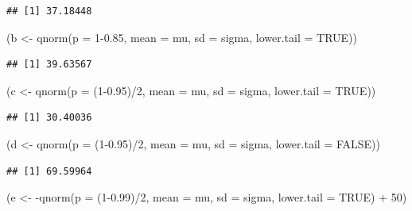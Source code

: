 \documentclass[
]{book}
\newenvironment{Shaded}{\begin{snugshade}}{\end{snugshade}}
\newcommand{\AttributeTok}[1]{\textcolor[rgb]{0.77,0.63,0.00}{#1}}
\newcommand{\ConstantTok}[1]{\textcolor[rgb]{0.00,0.00,0.00}{#1}}
\newcommand{\DecValTok}[1]{\textcolor[rgb]{0.00,0.00,0.81}{#1}}
\newcommand{\FloatTok}[1]{\textcolor[rgb]{0.00,0.00,0.81}{#1}}
\newcommand{\FunctionTok}[1]{\textcolor[rgb]{0.00,0.00,0.00}{#1}}
\newcommand{\NormalTok}[1]{#1}
\newcommand{\OtherTok}[1]{\textcolor[rgb]{0.56,0.35,0.01}{#1}}
\newcommand{\SpecialCharTok}[1]{\textcolor[rgb]{0.00,0.00,0.00}{#1}}
\begin{document}
\begin{verbatim}
## [1] 37.18448
\end{verbatim}

\begin{Shaded}
\begin{Highlighting}[]
\NormalTok{(b }\OtherTok{\textless{}{-}} \FunctionTok{qnorm}\NormalTok{(}\AttributeTok{p =} \DecValTok{1}\FloatTok{{-}0.85}\NormalTok{, }\AttributeTok{mean =}\NormalTok{ mu, }\AttributeTok{sd =}\NormalTok{ sigma, }\AttributeTok{lower.tail =} \ConstantTok{TRUE}\NormalTok{))}
\end{Highlighting}
\end{Shaded}

\begin{verbatim}
## [1] 39.63567
\end{verbatim}

\begin{Shaded}
\begin{Highlighting}[]
\NormalTok{(c }\OtherTok{\textless{}{-}} \FunctionTok{qnorm}\NormalTok{(}\AttributeTok{p =}\NormalTok{ (}\DecValTok{1}\FloatTok{{-}0.95}\NormalTok{)}\SpecialCharTok{/}\DecValTok{2}\NormalTok{, }\AttributeTok{mean =}\NormalTok{ mu, }\AttributeTok{sd =}\NormalTok{ sigma, }\AttributeTok{lower.tail =} \ConstantTok{TRUE}\NormalTok{))}
\end{Highlighting}
\end{Shaded}

\begin{verbatim}
## [1] 30.40036
\end{verbatim}

\begin{Shaded}
\begin{Highlighting}[]
\NormalTok{(d }\OtherTok{\textless{}{-}} \FunctionTok{qnorm}\NormalTok{(}\AttributeTok{p =}\NormalTok{ (}\DecValTok{1}\FloatTok{{-}0.95}\NormalTok{)}\SpecialCharTok{/}\DecValTok{2}\NormalTok{, }\AttributeTok{mean =}\NormalTok{ mu, }\AttributeTok{sd =}\NormalTok{ sigma, }\AttributeTok{lower.tail =} \ConstantTok{FALSE}\NormalTok{))}
\end{Highlighting}
\end{Shaded}

\begin{verbatim}
## [1] 69.59964
\end{verbatim}

\begin{Shaded}
\begin{Highlighting}[]
\NormalTok{(e }\OtherTok{\textless{}{-}} \SpecialCharTok{{-}}\FunctionTok{qnorm}\NormalTok{(}\AttributeTok{p =}\NormalTok{ (}\DecValTok{1}\FloatTok{{-}0.99}\NormalTok{)}\SpecialCharTok{/}\DecValTok{2}\NormalTok{, }\AttributeTok{mean =}\NormalTok{ mu, }\AttributeTok{sd =}\NormalTok{ sigma, }\AttributeTok{lower.tail =} \ConstantTok{TRUE}\NormalTok{) }\SpecialCharTok{+} \DecValTok{50}\NormalTok{)}
\end{Highlighting}
\end{Shaded}
\end{document}
